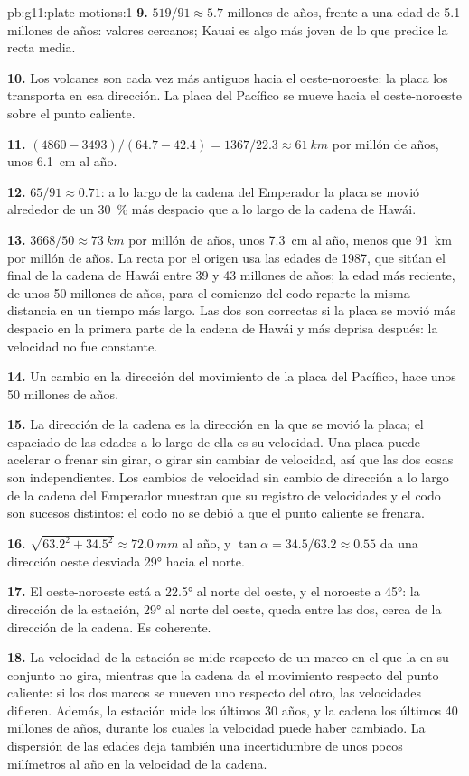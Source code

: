 \begin{solution}{pb:g11:plate-motions:1}
\textbf{9.} $519/91 \approx 5.7$ millones de años, frente a una edad de
\num{5.1} millones de años: valores cercanos; Kauai es algo más joven de lo que
predice la recta media.

\textbf{10.} Los volcanes son cada vez más antiguos hacia el oeste-noroeste:
la placa los transporta en esa dirección. La placa del Pacífico se mueve hacia
el oeste-noroeste sobre el punto caliente.

\textbf{11.} $(4860 - 3493)/(64.7 - 42.4) = 1367/22.3 \approx \qty{61}{km}$
por millón de años, unos \qty{6.1}{cm} al año.

\textbf{12.} $65/91 \approx 0.71$: a lo largo de la cadena del Emperador la
placa se movió alrededor de un \qty{30}{\percent} más despacio que a lo largo
de la cadena de Hawái.

\textbf{13.} $3668/50 \approx \qty{73}{km}$ por millón de años, unos
\qty{7.3}{cm} al año, menos que \qty{91}{km} por millón de años. La recta por el origen
usa las edades de 1987, que sitúan el final de la cadena de Hawái entre 39 y
43 millones de años; la edad más reciente, de unos 50 millones de años, para
el comienzo del codo reparte la misma distancia en un tiempo más largo. Las
dos son correctas si la placa se movió más despacio en la primera parte de la
cadena de Hawái y más deprisa después: la velocidad no fue constante.

\textbf{14.} Un cambio en la dirección del movimiento de la placa del
Pacífico, hace unos 50 millones de años.

\textbf{15.} La dirección de la cadena es la dirección en la que se movió la
placa; el espaciado de las edades a lo largo de ella es su velocidad. Una
placa puede acelerar o frenar sin girar, o girar sin cambiar de velocidad, así
que las dos cosas son independientes. Los cambios de velocidad sin cambio de
dirección a lo largo de la cadena del Emperador muestran que su registro de
velocidades y el codo son sucesos distintos: el codo no se debió a que el
punto caliente se frenara.

\textbf{16.} $\sqrt{63.2^2 + 34.5^2} \approx \qty{72.0}{mm}$ al año, y
$\tan\alpha = 34.5/63.2 \approx 0.55$ da una dirección oeste desviada \ang{29}
hacia el norte.

\textbf{17.} El oeste-noroeste está a \ang{22.5} al norte del oeste, y el
noroeste a \ang{45}: la dirección de la estación, \ang{29} al norte del oeste,
queda entre las dos, cerca de la dirección de la cadena. Es coherente.

\textbf{18.} La velocidad de la estación se mide respecto de un marco en el
que la  en su conjunto no gira, mientras que la cadena da el
movimiento respecto del punto caliente: si los dos marcos se mueven uno
respecto del otro, las velocidades difieren. Además, la estación mide los
últimos 30 años, y la cadena los últimos 40 millones de años, durante los
cuales la velocidad puede haber cambiado. La dispersión de las edades deja
también una incertidumbre de unos pocos milímetros al año en la velocidad de
la cadena.


\end{solution}
